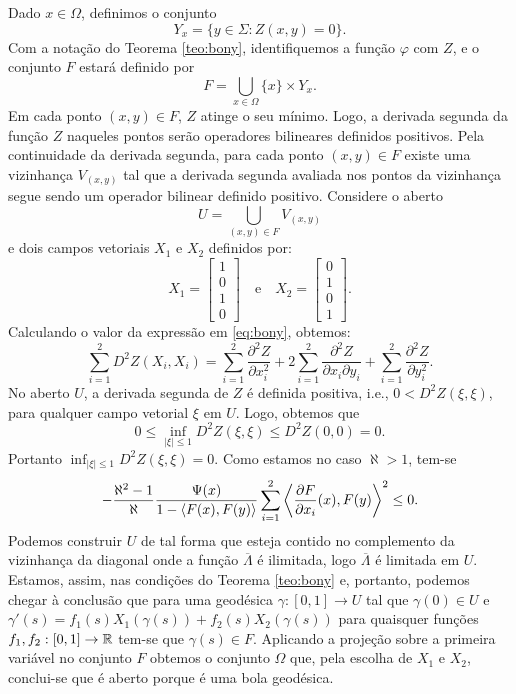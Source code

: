 \begin{demonstracao}
Dado $x \in \Omega$,	definimos o conjunto
\[ Y_x = \{ y \in \Sigma: Z(x,y)=0 \}. \]
Com a notação do Teorema \ref{teo:bony},  identifiquemos a função $\varphi$ com $Z$, e o conjunto $F$ estará definido por
\[F = \bigcup_{x \in \Omega} \{x\} \times Y_x.  \]
Em cada ponto $(x,y) \in F$, $Z$ atinge o seu mínimo. Logo, a derivada segunda da função $Z$ naqueles pontos serão operadores bilineares definidos positivos. Pela continuidade da derivada segunda, para cada ponto $(x,y) \in F$ existe uma vizinhança $V_{(x,y)}$ tal que a derivada segunda avaliada nos pontos da vizinhança segue sendo um operador bilinear definido positivo. 
Considere o aberto
\[ U = \bigcup_{(x,y) \in F} V_{(x,y)} \]
e dois campos vetoriais $X_1$ e $X_2$ definidos por:
\[ X_1 = \left[ \begin{matrix}
1\\
0\\
1\\
0
\end{matrix} \right] \quad \text{e} \quad X_2 = \left[ \begin{matrix}
0\\
1\\
0\\
1
\end{matrix} \right]. \]
Calculando o valor da expressão em \eqref{eq:bony}, obtemos:
\[ \sum_{i=1}^{2} D^2 Z (X_i,X_i) = \sum_{i=1}^{2} \frac{\partial^2 Z}{\partial x_i^2} + 2 \sum_{i=1}^{2} \frac{\partial^2 Z}{\partial x_i \partial y_i} + \sum_{i=1}^{2} \frac{\partial^2 Z}{\partial y_i^2}. \] 
No aberto $U$, a derivada segunda de $Z$ é definida positiva, i.e., $0 < D^2 Z(\xi,\xi)$, para qualquer campo vetorial $\xi$ em $U$. Logo, obtemos que
\[ 0 \leq \inf_{|\xi| \leq 1} D^2 Z(\xi,\xi) \leq D^2 Z (0,0) = 0. \]
Portanto $\inf_{|\xi| \leq 1} D^2 Z(\xi,\xi) = 0$.
Como estamos no caso $\aleph > 1$, tem-se
\[ - \frac{\aleph^2 -1}{\aleph} \frac{\Psi(x)}{1 - \left\langle F(x),F(y) \right\rangle} \sum_{i=1}^{2} \left\langle \frac{\partial F}{\partial x_i}(x),F(y) \right\rangle^2 \leq 0. \]
Podemos construir $U$ de tal forma que esteja contido no complemento da vizinhança da diagonal onde a função $\overline{\Lambda}$ é ilimitada, logo $\overline{\Lambda}$ é limitada em $U$.
Estamos, assim, nas condições do Teorema \ref{teo:bony} e, portanto, podemos chegar à conclusão que para uma geodésica $\gamma: [0,1] \rightarrow U$ tal que $\gamma(0) \in U$ e $\gamma'(s) = f_1(s) X_1(\gamma(s)) + f_2(s) X_2(\gamma(s))$ para quaisquer funções $f_1,f_2: [0,1] \rightarrow \mathbb{R}$ tem-se que $\gamma(s) \in F$.
Aplicando a projeção sobre a primeira variável no conjunto $F$ obtemos o conjunto $\Omega$ que, pela escolha de $X_1$ e $X_2$, conclui-se que é aberto porque é uma bola geodésica. 
\end{demonstracao}


